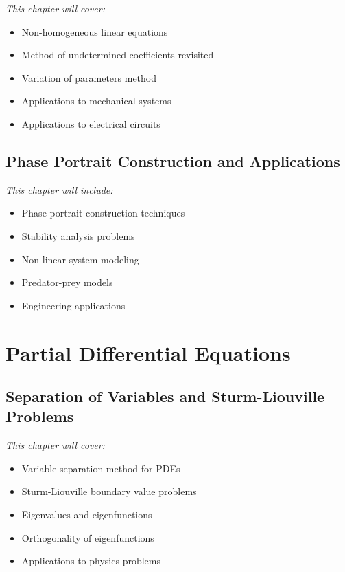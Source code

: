 \documentclass[12pt, letterpaper]{book}
\theoremstyle{problemstyle}
\theoremstyle{solutionstyle}
\begin{document}
\textit{This chapter will cover:}
\begin{itemize}
    \item Non-homogeneous linear equations
    \item Method of undetermined coefficients revisited
    \item Variation of parameters method
    \item Applications to mechanical systems
    \item Applications to electrical circuits
\end{itemize}

\chapter{Phase Portrait Construction and Applications}
\label{chap:session_16}

\textit{This chapter will include:}
\begin{itemize}
    \item Phase portrait construction techniques
    \item Stability analysis problems
    \item Non-linear system modeling
    \item Predator-prey models
    \item Engineering applications
\end{itemize}

\part{Partial Differential Equations}
\label{part:partial_de}

\chapter{Separation of Variables and Sturm-Liouville Problems}
\label{chap:session_17}

\textit{This chapter will cover:}
\begin{itemize}
    \item Variable separation method for PDEs
    \item Sturm-Liouville boundary value problems
    \item Eigenvalues and eigenfunctions
    \item Orthogonality of eigenfunctions
    \item Applications to physics problems
\end{itemize}
\end{document}

